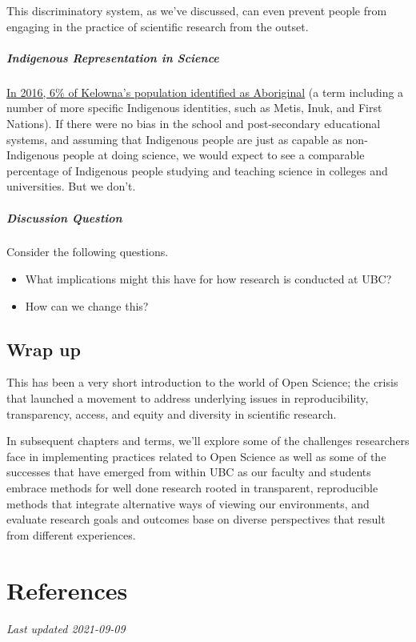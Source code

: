 \documentclass[
]{book}
\providecommand{\tightlist}{%
  \setlength{\itemsep}{0pt}\setlength{\parskip}{0pt}}
\begin{document}
This discriminatory system, as we've discussed, can even prevent people from engaging in the practice of scientific research from the outset.

\hypertarget{indigenous-representation-in-science}{%
\paragraph*{Indigenous Representation in Science}\label{indigenous-representation-in-science}}

\href{https://www12.statcan.gc.ca/census-recensement/2016/as-sa/fogs-spg/Facts-cma-eng.cfm?LANG=Eng\&GK=CMA\&GC=915\&TOPIC=9}{In 2016, 6\% of Kelowna's population identified as Aboriginal} (a term including a number of more specific Indigenous identities, such as Metis, Inuk, and First Nations). If there were no bias in the school and post-secondary educational systems, and assuming that Indigenous people are just as capable as non-Indigenous people at doing science, we would expect to see a comparable percentage of Indigenous people studying and teaching science in colleges and universities. But we don't.

\hypertarget{discussion-question}{%
\paragraph*{Discussion Question}\label{discussion-question}}

Consider the following questions.

\begin{itemize}
\tightlist
\item
  What implications might this have for how research is conducted at UBC?
\item
  How can we change this?
\end{itemize}

\hypertarget{wrap-up}{%
\section{Wrap up}\label{wrap-up}}

This has been a very short introduction to the world of Open Science; the crisis that launched a movement to address underlying issues in reproducibility, transparency, access, and equity and diversity in scientific research.

In subsequent chapters and terms, we'll explore some of the challenges researchers face in implementing practices related to Open Science as well as some of the successes that have emerged from within UBC as our faculty and students embrace methods for well done research rooted in transparent, reproducible methods that integrate alternative ways of viewing our environments, and evaluate research goals and outcomes base on diverse perspectives that result from different experiences.

\hypertarget{references}{%
\chapter{References}\label{references}}

\emph{Last updated 2021-09-09}

  
\end{document}
